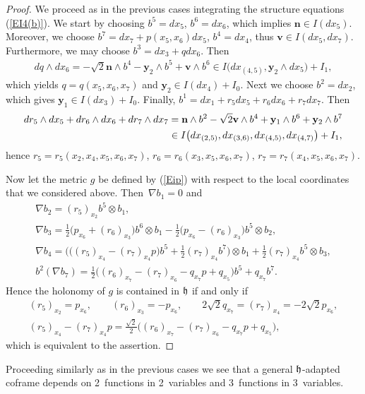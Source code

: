 \documentclass[pdftex]{sigma}
\numberwithin{equation}{section}
\newcommand\fh{{\frak h}}
\newcommand\by{{\mathbf y}}
\newcommand\bn{{\mathbf n}}
\newcommand\bv{{\mathbf v}}
\begin{document}
\begin{proof} We proceed as in the previous cases integrating the structure equations (\ref{EI4(b)}). We start by choosing $b^5=dx_5$, $b^6=dx_6$, which implies $\bn\in I(dx_5)$. Moreover, we choose $b^7= dx_7 +p(x_5,x_6)dx_5$, $b^4=dx_4$, thus $\bv\in I(dx_5,dx_7)$. Furthermore, we may choose $b^3= dx_3+qdx_6$. Then
\begin{gather*}dq\wedge dx_6=-\sqrt 2 \bn\wedge b^4 -\by_2\wedge b^5+\bv\wedge b^6 \in I\big(dx_{(4,5)},\by_2\wedge dx_5\big)+I_1, \end{gather*}
which yields $q=q(x_5,x_6,x_7)$ and $\by_2\in I(dx_4)+I_0$. Next we choose $b^2=dx_2$, which gives $\by_1\in I(dx_3)+I_0$. Finally, $b^1= dx_1 + r_5dx_5+r_6dx_6+r_7dx_7$. Then
\begin{gather*}
dr_5\wedge dx_5+dr_6\wedge dx_6+dr_7\wedge dx_7 = \bn\wedge b^2 -\sqrt 2 \bv\wedge b^4+\by_1\wedge b^6+\by_2\wedge b^7\\
\hphantom{dr_5\wedge dx_5+dr_6\wedge dx_6+dr_7\wedge dx_7}{} \in I\big(dx_{(2,5)}, dx_{(3,6)}, dx_{(4,5)}, dx_{(4,7)}\big) +I_1,
\end{gather*}
hence $r_5=r_5(x_2,x_4,x_5,x_6, x_7)$, $r_6=r_6(x_3,x_5,x_6,x_7)$, $r_7=r_7(x_4,x_5,x_6,x_7)$.

Now let the metric $g$ be defined by (\ref{Eip}) with respect to the local coordinates that we considered above. Then~$\nabla b_1=0$ and
\begin{gather*}
\nabla b_2= (r_5)_{x_2} b^5\otimes b_1,\\
\nabla b_3= \tfrac12 \big(p_{x_6}+(r_6)_{x_3}\big)b^6\otimes b_1 - \tfrac12 \big(p_{x_6}-(r_6)_{x_3}\big)b^5\otimes b_2,\\
\nabla b_4= \big( \big((r_5)_{x_4}-(r_7)_{x_4}p\big)b^5+ \tfrac12 (r_7)_{x_4}b^7\big)\otimes b_1 + \tfrac12 (r_7)_{x_4}b^5\otimes b_3,\\
b^2(\nabla b_7)= \tfrac12 \big( (r_6)_{x_7}-(r_7)_{x_6}-q_{x_7}p+q_{x_5}\big)b^5+q_{x_7}b^7.
\end{gather*}
Hence the holonomy of $g$ is contained in $\fh$ if and only if
\begin{gather*}
(r_5)_{x_2}=p_{x_6},\qquad (r_6)_{x_3}=-p_{x_6},\qquad 2\sqrt2 q_{x_7}=(r_7)_{x_4}=-2\sqrt2 p_{x_6},\\
(r_5)_{x_4}-(r_7)_{x_4}p= \tfrac{\sqrt2}2 \big((r_6)_{x_7}-(r_7)_{x_6}-q_{x_7}p+q_{x_5}\big),
\end{gather*}
which is equivalent to the assertion.
\end{proof}
\begin{Remark} Proceeding similarly as in the previous cases we see that a general $\fh$-adapted coframe depends on 2~functions in 2~variables and 3~functions in 3~variables.
\end{Remark}
\end{document}
